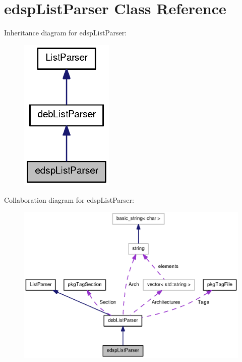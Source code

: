 \section{edsp\-List\-Parser \-Class \-Reference}
\label{classedspListParser}


\-Inheritance diagram for edsp\-List\-Parser\-:
\nopagebreak
\begin{figure}[H]
\begin{center}
\leavevmode
\includegraphics[width=126pt]{classedspListParser__inherit__graph}
\end{center}
\end{figure}


\-Collaboration diagram for edsp\-List\-Parser\-:
\nopagebreak
\begin{figure}[H]
\begin{center}
\leavevmode
\includegraphics[width=350pt]{classedspListParser__coll__graph}
\end{center}
\end{figure}
